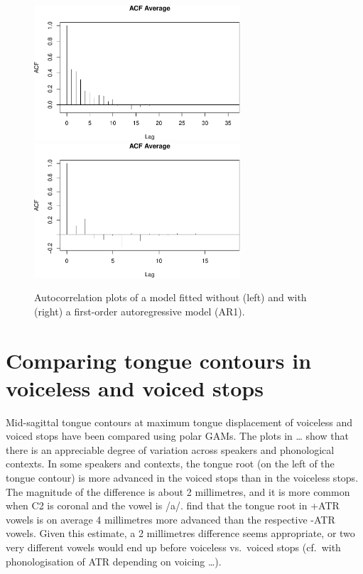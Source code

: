 \documentclass[12pt,]{article}
\begin{document}
\begin{figure}

{\centering \includegraphics[width=.7\linewidth,height=5cm]{2018-polar-gam_files/figure-latex/it01-acf-1} \includegraphics[width=.7\linewidth,height=5cm]{2018-polar-gam_files/figure-latex/it01-acf-2} 

}

\caption{Autocorrelation plots of a model fitted without (left) and with (right) a first-order autoregressive model (AR1).}\label{f:it01-acf}
\end{figure}

\hypertarget{comparing-tongue-contours-in-voiceless-and-voiced-stops}{%
\section{Comparing tongue contours in voiceless and voiced
stops}\label{comparing-tongue-contours-in-voiceless-and-voiced-stops}}

Mid-sagittal tongue contours at maximum tongue displacement of voiceless
and voiced stops have been compared using polar GAMs. The plots in
\ldots{} show that there is an appreciable degree of variation across
speakers and phonological contexts. In some speakers and contexts, the
tongue root (on the left of the tongue contour) is more advanced in the
voiced stops than in the voiceless stops. The magnitude of the
difference is about 2 millimetres, and it is more common when C2 is
coronal and the vowel is /a/. \citet{kirkham2017} find that the tongue
root in +ATR vowels is on average 4 millimetres more advanced than the
respective -ATR vowels. Given this estimate, a 2 millimetres difference
seems appropriate, or two very different vowels would end up before
voiceless vs.~voiced stops (cf.~with phonologisation of ATR depending on
voicing \ldots{}).
\end{document}
